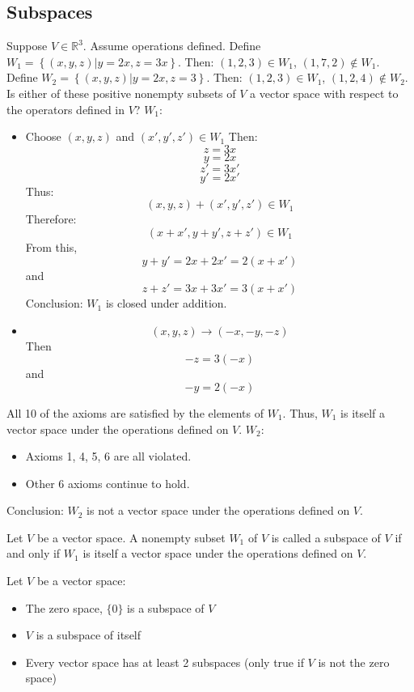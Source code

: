 \documentclass[12pt]{article}
\begin{document}
\subsection{Subspaces} 
\begin{example} Suppose $V \in \mathbb{R}^3$. Assume operations defined. Define $W_1 = \left \{(x, y, z) | y = 2x, z = 3x \right\} $. Then: $(1, 2, 3) \in W_1$, $(1, 7, 2) \notin W_1$. Define $W_2 = \left \{(x, y, z) | y = 2x, z = 3 \right \} $. Then: $ (1, 2, 3) \in W_1$, $(1, 2, 4) \notin W_2$. Is either of these positive nonempty subsets of $V$ a vector space with respect to the operators defined in $V$? \newline $W_1$: \begin{itemize} \item Choose $(x, y, z)$ and $(x', y', z') \in W_1$ Then: $$ z = 3x$$ $$ y = 2x $$ $$ z' = 3x' $$ $$ y' = 2x' $$ Thus: $$ (x, y, z) + (x', y', z') \in W_1 $$ Therefore: $$ (x + x', y + y', z + z') \in W_1 $$ From this, $$ y + y' = 2x + 2x' = 2(x + x') $$ and $$ z + z' = 3x + 3x' = 3(x + x') $$ Conclusion: $W_1$ is closed under addition. \item $$(x, y, z) \rightarrow (-x, -y, -z)$$ Then $$ -z = 3(-x) $$ and $$ -y = 2(-x) $$ \end{itemize} All 10 of the axioms are satisfied by the elements of $W_1$. Thus, $W_1$ is itself a vector space under the operations defined on $V$. \newline $W_2$: \begin{itemize} \item Axioms 1, 4, 5, 6 are all violated. \item Other 6 axioms continue to hold. \end{itemize} Conclusion: $W_2$ is not a vector space under the operations defined on $V$. \end{example} 
\begin{definition} Let $V$ be a vector space. A nonempty subset $W_1$ of $V$ is called a subspace of $V$ if and only if $W_1$ is itself a vector space under the operations defined on $V$. \end{definition} 
Let $V$ be a vector space: \begin{itemize} 
\item The zero space, $\{0\}$ is a subspace of $V$ 
\item $V$ is a subspace of itself 
\item Every vector space has at least 2 subspaces (only true if $V$ is not the zero space) \end{itemize}
\end{document}
